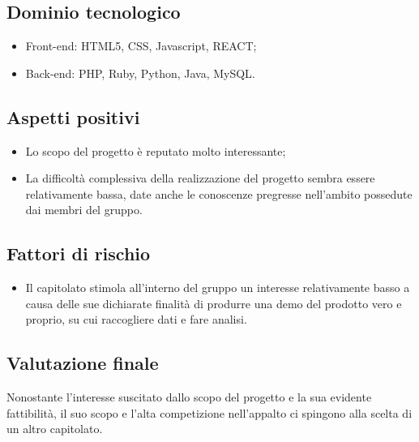 \documentclass[openany,12pt,a4paper]{report}
\begin{document}
\subsection{Dominio tecnologico}

\begin{itemize}
    \item{Front-end:} HTML5, CSS, Javascript, REACT;
    
    \item{Back-end:}  PHP, Ruby, Python, Java, MySQL.
\end{itemize}

\subsection{Aspetti positivi}

\begin{itemize}
    \item Lo scopo del progetto è reputato molto interessante;
    
    \item La difficoltà complessiva della realizzazione del progetto sembra essere relativamente bassa, date anche le conoscenze pregresse nell'ambito possedute dai membri del gruppo.
\end{itemize}

\subsection{Fattori di rischio}

\begin{itemize}
    \item Il capitolato stimola all'interno del gruppo un interesse relativamente basso a causa delle sue dichiarate finalità di produrre una demo del prodotto vero e proprio, su cui raccogliere dati e fare analisi.
\end{itemize}

\subsection{Valutazione finale}

Nonostante l'interesse suscitato dallo scopo del progetto e la sua evidente fattibilità, il suo scopo e l'alta competizione nell'appalto ci spingono alla scelta di un altro capitolato.
\end{document}

